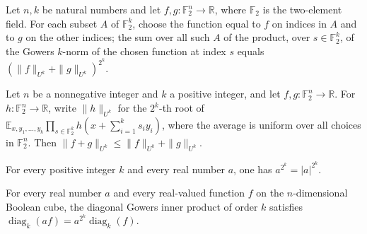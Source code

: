 \begin{theorem}
\label{FABL.sum_prod_gowersNorm_choice}
\leanok
{}
Let $n,k$ be natural numbers and let $f,g:\mathbb F_2^n\to\mathbb R$, where $\mathbb
F_2$ is the two-element field. For each subset $A$ of $\mathbb F_2^k$, choose the
function equal to $f$ on indices in $A$ and to $g$ on the other indices; the sum over
all such $A$ of the product, over $s\in\mathbb F_2^k$, of the Gowers $k$-norm of the
chosen function at index $s$ equals $(\|f\|_{U^k}+\|g\|_{U^k})^{2^k}$.
\end{theorem}

\begin{theorem}
\label{FABL.gowersNorm_add_le}
\leanok
{}
Let $n$ be a nonnegative integer and $k$ a positive integer, and let $f,g\colon\mathbb
F_2^n\to\mathbb R$. For $h\colon\mathbb F_2^n\to\mathbb R$, write $\|h\|_{U^k}$ for the
$2^k$-th root of $\mathbb E_{x,y_1,\ldots,y_k}\prod_{s\in\mathbb F_2^k}h(x+\sum_{i=1}^k
s_i y_i)$, where the average is uniform over all choices in $\mathbb F_2^n$. Then
$\|f+g\|_{U^k}\leq \|f\|_{U^k}+\|g\|_{U^k}$.
\end{theorem}

\begin{theorem}
\label{FABL.pow_two_pow_eq_abs_pow_two_pow}
\leanok
{}
For every positive integer $k$ and every real number $a$, one has $a^{2^k}=|a|^{2^k}$.
\end{theorem}

\begin{theorem}
\label{FABL.gowersDiagonalInner_smul}
\leanok
{}
For every real number $a$ and every real-valued function $f$ on the $n$-dimensional
Boolean cube, the diagonal Gowers inner product of order $k$ satisfies
$\operatorname{diag}_k(af)=a^{2^k}\operatorname{diag}_k(f)$.
\end{theorem}

